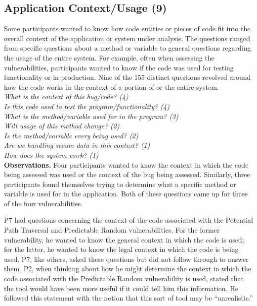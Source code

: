 \documentclass[conference]{IEEEtran}
\begin{document}

\noindent\subsection{\textbf{Application Context/Usage (9)}}\label{acu}


Some participants wanted to know how code entities or pieces of code fit into the overall context of the application or system under analysis. 
The questions ranged from specific questions about a method or variable to general questions regarding the usage of the entire system. 
For example, often when assessing the vulnerabilities, participants wanted to know if the code was used for testing functionality or in production. 
Nine of the 155 distinct questions revolved around how the code works in the context of a portion of or the entire system.
\\

\noindent\emph{What is the context of this bug/code? (4)} \\
\emph{Is this code used to test the program/functionality? (4)} \\
\emph{What is the method/variable used for in the program? (3)} \\
\emph{Will usage of this method change? (2)} \\
\emph{Is the method/variable every being used? (2)} \\
\emph{Are we handling secure data in this context? (1)} \\
\emph{How does the system work? (1)} \\



\noindent\textbf{Observations.}
Four participants wanted to know the context in which the code being assessed was used or the context of the bug being assessed.
Similarly, three participants found themselves trying to determine what a specific method or variable is used for in the application.
Both of these questions came up for three of the four vulnerabilities.

 
P7 had questions concerning the context of the code associated with the Potential Path Traversal and Predictable Random vulnerabilities.
For the former vulnerability, he wanted to know the general context in which the code is used; for the latter, he wanted to know the legal context in which the code is being used.
P7, like others, asked these questions but did not follow through to answer them. 
P2, when thinking about how he might determine the context in which the code associated with the Predictable Random vulnerability is used, stated that the tool would have been more useful if it could tell him this information.
He followed this statement with the notion that this sort of tool may be ``unrealistic.'' 
\end{document}
